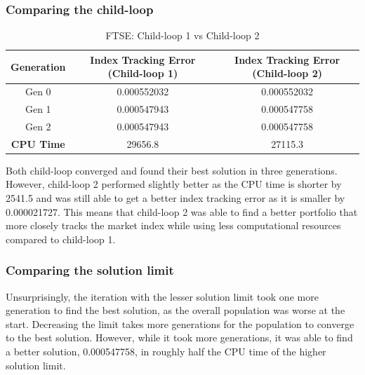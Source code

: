 \documentclass[12pt]{report}
\begin{document}
\subsubsection*{Comparing the child-loop}
\begin{table}[h!]
\centering
\begin{tabular}{| c | c| c|} 
\hline
\rowcolor{lightgray}
\textbf{Generation} & \textbf{Index Tracking Error (Child-loop 1)} & \textbf{Index Tracking Error (Child-loop 2)} \\
\hline
Gen 0 & 0.000552032 & 0.000552032\\ \hline
Gen 1 & 0.000547943 & 0.000547758\\ \hline
Gen 2 & 0.000547943 & 0.000547758\\ \hline
\textbf{CPU Time}& 29656.8 & 27115.3\\
\hline
\end{tabular}
\caption{FTSE: Child-loop 1 vs Child-loop 2}
\label{table:ftsechild}
\end{table}
\noindent
Both child-loop converged and found their best solution in three generations. However, child-loop 2 performed slightly better as the CPU time is shorter by 2541.5 and was still able to get a better index tracking error as it is smaller by 0.000021727. This means that child-loop 2 was able to find a better portfolio that more closely tracks the market index while using less computational resources compared to child-loop 1.

\subsubsection*{Comparing the solution limit}
\begin{table}[h!]
\centering
{}
\caption{FTSE: Solution limit 20 vs Solution limit 10}
\label{table:ftsesollimit}
\end{table}
\noindent 
Unsurprisingly, the iteration with the lesser solution limit took one more generation to find the best solution, as the overall population was worse at the start. Decreasing the limit takes more generations for the population to converge to the best solution. However, while it took more generations, it was able to find a better solution, 0.000547758, in roughly half the CPU time of the higher solution limit.
\end{document}
